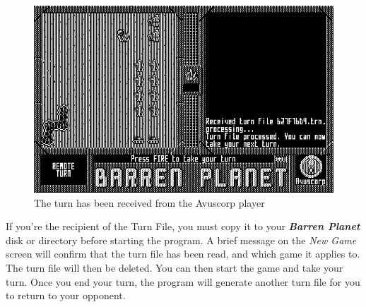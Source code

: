 \begin{figure}[h]
  \includegraphics[width=\textwidth]{turn-receive}
  \caption{The turn has been received from the Avuscorp player}
\end{figure}

If you're the recipient of the Turn File, you must copy it to your {\bf \it Barren Planet} disk or directory before starting the program. A brief message on the {\it New Game} screen will confirm that the turn file has been read, and which game it applies to. The turn file will then be deleted. You can then start the game and take your turn. Once you end your turn, the program will generate another turn file for you to return to your opponent.
